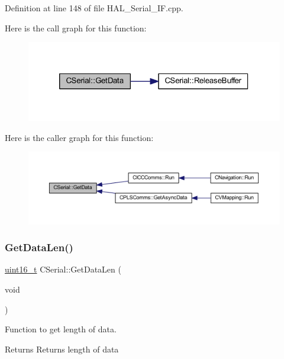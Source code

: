 Definition at line 148 of file H\+A\+L\+\_\+\+Serial\+\_\+\+I\+F.\+cpp.

Here is the call graph for this function\+:\nopagebreak
\begin{figure}[H]
\begin{center}
\leavevmode
\includegraphics[width=320pt]{class_c_serial_abad86c07f530569b2ceeea75bda485ad_cgraph}
\end{center}
\end{figure}
Here is the caller graph for this function\+:\nopagebreak
\begin{figure}[H]
\begin{center}
\leavevmode
\includegraphics[width=350pt]{class_c_serial_abad86c07f530569b2ceeea75bda485ad_icgraph}
\end{center}
\end{figure}
\mbox{\label{class_c_serial_a4327d6041fe9a390612b214709027cbb}} 
\subsubsection{\texorpdfstring{Get\+Data\+Len()}{GetDataLen()}}
{\footnotesize\ttfamily \mbox{\hyperlink{_a_d_a_s___types_8h_a1f1825b69244eb3ad2c7165ddc99c956}{uint16\+\_\+t}} C\+Serial\+::\+Get\+Data\+Len (\begin{DoxyParamCaption}\item[{void}]{ }\end{DoxyParamCaption})}



Function to get length of data. 

\begin{DoxyReturn}{Returns}
Returns length of data 
\end{DoxyReturn}


